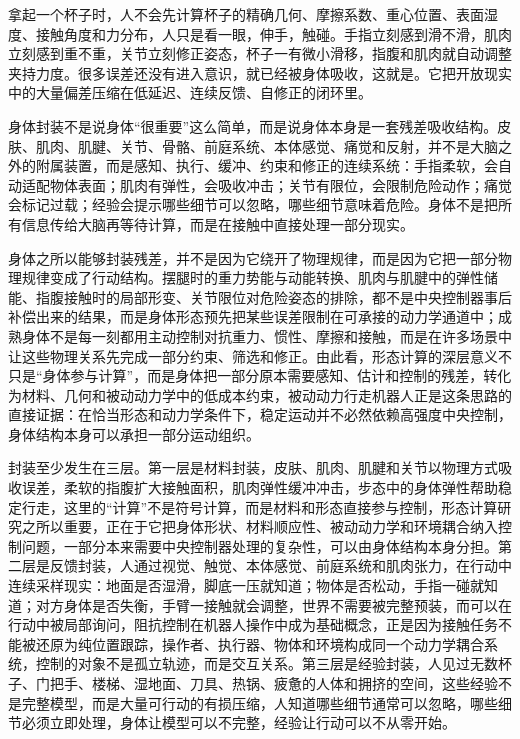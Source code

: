 
拿起一个杯子时，人不会先计算杯子的精确几何、摩擦系数、重心位置、表面湿度、接触角度和力分布，人只是看一眼，伸手，触碰。手指立刻感到滑不滑，肌肉立刻感到重不重，关节立刻修正姿态，杯子一有微小滑移，指腹和肌肉就自动调整夹持力度。很多误差还没有进入意识，就已经被身体吸收，这就是。它把开放现实中的大量偏差压缩在低延迟、连续反馈、自修正的闭环里。

身体封装不是说身体“很重要”这么简单，而是说身体本身是一套残差吸收结构。皮肤、肌肉、肌腱、关节、骨骼、前庭系统、本体感觉、痛觉和反射，并不是大脑之外的附属装置，而是感知、执行、缓冲、约束和修正的连续系统：手指柔软，会自动适配物体表面；肌肉有弹性，会吸收冲击；关节有限位，会限制危险动作；痛觉会标记过载；经验会提示哪些细节可以忽略，哪些细节意味着危险。身体不是把所有信息传给大脑再等待计算，而是在接触中直接处理一部分现实。

身体之所以能够封装残差，并不是因为它绕开了物理规律，而是因为它把一部分物理规律变成了行动结构。摆腿时的重力势能与动能转换、肌肉与肌腱中的弹性储能、指腹接触时的局部形变、关节限位对危险姿态的排除，都不是中央控制器事后补偿出来的结果，而是身体形态预先把某些误差限制在可承接的动力学通道中；成熟身体不是每一刻都用主动控制对抗重力、惯性、摩擦和接触，而是在许多场景中让这些物理关系先完成一部分约束、筛选和修正。由此看，形态计算的深层意义不只是“身体参与计算”，而是身体把一部分原本需要感知、估计和控制的残差，转化为材料、几何和被动动力学中的低成本约束\cite{paul2006}，被动动力行走机器人正是这条思路的直接证据：在恰当形态和动力学条件下，稳定运动并不必然依赖高强度中央控制，身体结构本身可以承担一部分运动组织\cite{mcgeer1990,full1999,collins2005}。

封装至少发生在三层。第一层是材料封装，皮肤、肌肉、肌腱和关节以物理方式吸收误差，柔软的指腹扩大接触面积，肌肉弹性缓冲冲击，步态中的身体弹性帮助稳定行走，这里的“计算”不是符号计算，而是材料和形态直接参与控制，形态计算研究之所以重要，正在于它把身体形状、材料顺应性、被动动力学和环境耦合纳入控制问题，一部分本来需要中央控制器处理的复杂性，可以由身体结构本身分担\cite{paul2006}。第二层是反馈封装，人通过视觉、触觉、本体感觉、前庭系统和肌肉张力，在行动中连续采样现实：地面是否湿滑，脚底一压就知道；物体是否松动，手指一碰就知道；对方身体是否失衡，手臂一接触就会调整，世界不需要被完整预装，而可以在行动中被局部询问，阻抗控制在机器人操作中成为基础概念，正是因为接触任务不能被还原为纯位置跟踪，操作者、执行器、物体和环境构成同一个动力学耦合系统，控制的对象不是孤立轨迹，而是交互关系\cite{hogan1985}。第三层是经验封装，人见过无数杯子、门把手、楼梯、湿地面、刀具、热锅、疲惫的人体和拥挤的空间，这些经验不是完整模型，而是大量可行动的有损压缩，人知道哪些细节通常可以忽略，哪些细节必须立即处理，身体让模型可以不完整，经验让行动可以不从零开始\cite{gibson1979}。

